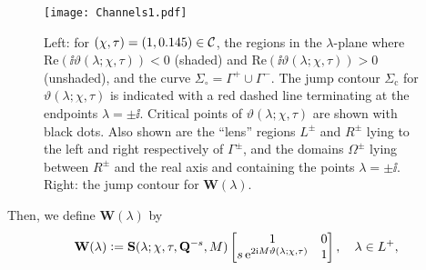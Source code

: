 \begin{figure}[h]
\begin{center}
\texttt{[image: Channels1.pdf]}
\end{center}
\caption{Left:  for $(\chi,\tau)=(1,0.145)\in \mathcal{C}$, the regions in the $\lambda$-plane where $\mathrm{Re}(\ii\vartheta(\lambda;\chi,\tau))<0$ (shaded) and $\mathrm{Re}(\ii\vartheta(\lambda;\chi,\tau))>0$ (unshaded), and the curve $\Sigma_\circ=\Gamma^+\cup\Gamma^-$.  The jump contour $\Sigma_\mathrm{c}$ for $\vartheta(\lambda;\chi,\tau)$ is indicated with a red dashed line terminating at the endpoints $\lambda=\pm\ii$.  Critical points of $\vartheta(\lambda;\chi,\tau)$ are shown with black dots.  Also shown are the ``lens'' regions $L^\pm$ and $R^\pm$ lying to the left and right respectively of $\Gamma^\pm$, and the domains $\Omega^\pm$ lying between $R^\pm$ and the real axis and containing the points $\lambda=\pm\ii$.  Right:  the jump contour for $\mathbf{W}(\lambda)$.}
\label{fig:Channels1}
\end{figure}
Then, we define $\mathbf{W}(\lambda)$ by 
\begin{equation}
\mathbf{W}(\lambda)\vcentcolon=\mathbf{S}(\lambda;\chi,\tau,\mathbf{Q}^{-s},M)\begin{bmatrix}1 & 0\\
s\,\mathrm{e}^{2\mathrm{i} M\vartheta(\lambda;\chi,\tau)} & 1\end{bmatrix},\quad\lambda\in L^+,
\label{eq:T-S-L-plus-ALT}
\end{equation}
